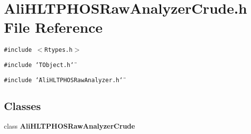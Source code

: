 \section{Ali\-HLTPHOSRaw\-Analyzer\-Crude.h File Reference}
\label{AliHLTPHOSRawAnalyzerCrude_8h}
{\tt \#include $<$Rtypes.h$>$}\par
{\tt \#include \char`\"{}TObject.h\char`\"{}}\par
{\tt \#include \char`\"{}Ali\-HLTPHOSRaw\-Analyzer.h\char`\"{}}\par
\subsection*{Classes}
\begin{CompactItemize}
\item 
class {\bf Ali\-HLTPHOSRaw\-Analyzer\-Crude}
\end{CompactItemize}
